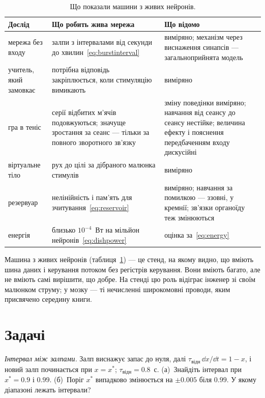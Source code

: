 \begin{table}[t]
\centering
\footnotesize
\setlength{\tabcolsep}{4pt}
\renewcommand{\arraystretch}{1.15}
\begin{tabular}{>{\raggedright}p{2.8cm}>{\raggedright}p{4.2cm}>{\raggedright\arraybackslash}p{5.8cm}}
\toprule
Дослід & Що робить жива мережа & Що відомо \\
\midrule
мережа без входу & залпи з інтервалами від секунди до хвилин~\eqref{eq:burstinterval} & виміряно; механізм через виснаження синапсів --- загальноприйнята модель \\
учитель, який замовкає & потрібна відповідь закріплюється, коли стимуляцію вимикають & виміряно \\
гра в теніс & серії відбитих м'ячів подовжуються; значуще зростання за сеанс --- тільки за повного зворотного зв'язку & зміну поведінки виміряно; навчання від сеансу до сеансу нестійке; величина ефекту і пояснення передбаченням входу дискусійні \\
віртуальне тіло & рух до цілі за дібраного малюнка стимулів & виміряно \\
резервуар & нелінійність і пам'ять для зчитування~\eqref{eq:reservoir} & виміряно; навчання за помилкою --- ззовні, у кремнії; зв'язки органоїду теж змінюються \\
енергія & близько $10^{-4}$~Вт на мільйон нейронів~\eqref{eq:dishpower} & оцінка за~\eqref{eq:energy} \\
\bottomrule
\end{tabular}
\caption{Що показали машини з живих нейронів.}
\label{tab:livingmachine}
\end{table}

Машина з живих нейронів (таблиця~\ref{tab:livingmachine}) --- це стенд, на якому видно, що вміють шина даних і керування потоком без регістрів керування. Вони вміють багато, але не вміють самі вирішити, що добре. На стенді цю роль відіграє інженер зі своїм малюнком струму; у мозку --- ті нечисленні широкомовні проводи, яким присвячено середину книги.

\section{Задачі}

\begin{exercise}[\lvlA]
\label{ex:21:1}
\emph{Інтервал між залпами.} Залп виснажує запас до нуля, далі $\tau_{\text{відн}}\,\dd x/\dd t=1-x$, і новий залп починається при $x=x^*$; $\tau_{\text{відн}}=0.8$~с. (а)~Знайдіть інтервал при $x^*=0.9$ і $0.99$. (б)~Поріг $x^*$ випадково змінюється на $\pm0.005$ біля $0.99$. У якому діапазоні лежать інтервали?
\end{exercise}


